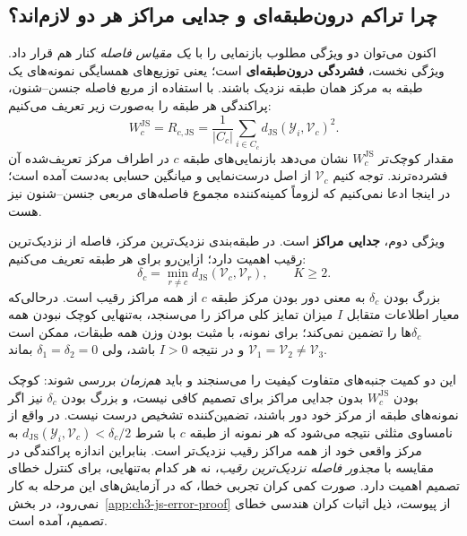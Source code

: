 \subsection{چرا تراکم درون‌طبقه‌ای و جدایی مراکز هر دو لازم‌اند؟}
\label{subsec:ch3-compactness-separation}
اکنون می‌توان دو ویژگی مطلوب بازنمایی را با \emph{یک مقیاس فاصله} کنار هم قرار داد. ویژگی نخست، \textbf{فشردگی درون‌طبقه‌ای} است؛ یعنی توزیع‌های همسایگی نمونه‌های یک طبقه به مرکز همان طبقه نزدیک باشند. با استفاده از مربع فاصله جنسن--شنون، پراکندگی هر طبقه را به‌صورت زیر تعریف می‌کنیم:
\begin{equation}\label{eq:ch3-js-within-dispersion}
\boxed{
W_c^{\mathrm{JS}}=R_{c,\mathrm{JS}}
=\frac1{|C_c|}\sum_{i\in C_c}
d_{\mathrm{JS}}(\mathscr Y_i,\mathcal V_c)^2.
}
\end{equation}
مقدار کوچک‌تر $W_c^{\mathrm{JS}}$ نشان می‌دهد بازنمایی‌های طبقه $c$ در اطراف مرکز تعریف‌شده آن فشرده‌ترند. توجه کنیم $\mathcal V_c$ از اصل درست‌نمایی و میانگین حسابی به‌دست آمده است؛ در اینجا ادعا نمی‌کنیم که لزوماً کمینه‌کننده مجموع فاصله‌های مربعی جنسن--شنون نیز هست.

ویژگی دوم، \textbf{جدایی مراکز} است. در طبقه‌بندی نزدیک‌ترین مرکز، فاصله از نزدیک‌ترین رقیب اهمیت دارد؛ ازاین‌رو برای هر طبقه تعریف می‌کنیم:
\begin{equation}\label{eq:ch3-js-center-separation}
\boxed{\delta_c
=\min_{r\ne c}d_{\mathrm{JS}}(\mathcal V_c,\mathcal V_r),
\qquad K\ge2.}
\end{equation}
بزرگ بودن $\delta_c$ به معنی دور بودن مرکز طبقه $c$ از همه مراکز رقیب است. درحالی‌که معیار اطلاعات متقابل $I$ میزان تمایز کلی مراکز را می‌سنجد، به‌تنهایی کوچک نبودن همه $\delta_c$ها را تضمین نمی‌کند؛ برای نمونه، با مثبت بودن وزن همه طبقات، ممکن است $\mathcal V_1=\mathcal V_2\ne\mathcal V_3$ و در نتیجه $I>0$ باشد، ولی $\delta_1=\delta_2=0$ بماند.

این دو کمیت جنبه‌های متفاوت کیفیت را می‌سنجند و باید \emph{هم‌زمان} بررسی شوند: کوچک بودن $W_c^{\mathrm{JS}}$ بدون جدایی مراکز برای تصمیم کافی نیست، و بزرگ بودن $\delta_c$ نیز اگر نمونه‌های طبقه از مرکز خود دور باشند، تضمین‌کننده تشخیص درست نیست. در واقع از نامساوی مثلثی نتیجه می‌شود که هر نمونه از طبقه $c$ با شرط
$d_{\mathrm{JS}}(\mathscr Y_i,\mathcal V_c)<\delta_c/2$
به مرکز واقعی خود از همه مراکز رقیب نزدیک‌تر است. بنابراین اندازه پراکندگی در مقایسه با \emph{مجذور فاصله نزدیک‌ترین رقیب}، نه هر کدام به‌تنهایی، برای کنترل خطای تصمیم اهمیت دارد. صورت کمی کران تجربی خطا، که در آزمایش‌های این مرحله به کار نمی‌رود، در بخش~\ref{app:ch3-js-error-proof} از پیوست، ذیل اثبات کران هندسی خطای تصمیم، آمده است.


